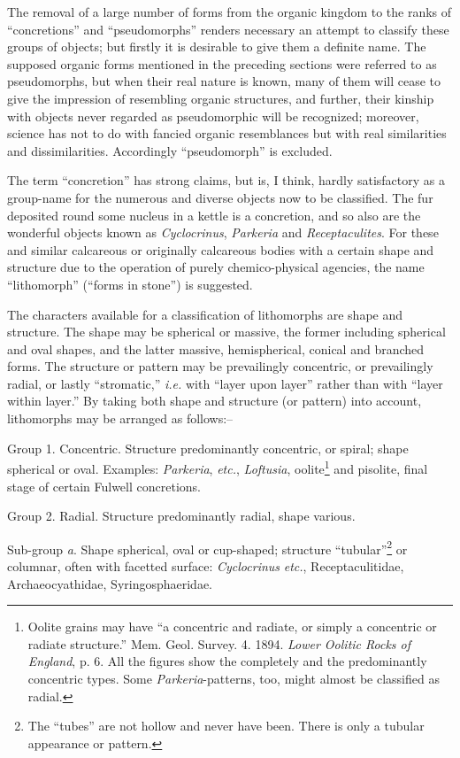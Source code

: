 \documentclass[a4paper, 12pt, oneside]{article}
\begin{document}
The removal of a large number of forms from the organic kingdom to the ranks of ``concretions'' and ``pseudomorphs'' renders necessary an attempt to classify these groups of objects; but firstly it is desirable to give them a definite name. The supposed organic forms mentioned in the preceding sections were referred to as pseudomorphs, but when their real nature is known, many of them will cease to give the impression of resembling organic structures, and further, their kinship with objects never regarded as pseudomorphic will be recognized; moreover, science has not to do with fancied organic resemblances but with real similarities and dissimilarities. Accordingly ``pseudomorph'' is excluded.

The term ``concretion'' has strong claims, but is, I think, hardly satisfactory as a group-name for the numerous and diverse objects now to be classified. The fur deposited round some nucleus in a kettle is a concretion, and so also are the wonderful objects known as \emph{Cyclocrinus}, \emph{Parkeria} and \emph{Receptaculites}. For these and similar calcareous or originally calcareous bodies with a certain shape and structure due to the operation of purely chemico-physical agencies, the name ``lithomorph'' (``forms in stone'') is suggested.

The characters available for a classification of lithomorphs are shape and structure. The shape may be spherical or massive, the former including spherical and oval shapes, and the latter massive, hemispherical, conical and branched forms. The structure or pattern may be prevailingly concentric, or prevailingly radial, or lastly ``stromatic,'' \emph{i.e.} with ``layer upon layer'' rather than with ``layer within layer.'' By taking both shape and structure (or pattern) into account, lithomorphs may be arranged as follows:--

Group 1. Concentric. Structure predominantly concentric, or spiral; shape spherical or oval. Examples: \emph{Parkeria}, \emph{etc.}, \emph{Loftusia}, oolite\footnote{Oolite grains may have ``a concentric and radiate, or simply a concentric or radiate structure.'' Mem. Geol. Survey. 4. 1894. \emph{Lower Oolitic Rocks of England}, p. 6. All the figures show the completely and the predominantly concentric types. Some \emph{Parkeria}-patterns, too, might almost be classified as radial.} and pisolite, final stage of certain Fulwell concretions.

Group 2. Radial. Structure predominantly radial, shape various.

Sub-group \emph{a}. Shape spherical, oval or cup-shaped; structure ``tubular''\footnote{The ``tubes'' are not hollow and never have been. There is only a tubular appearance or pattern.} or columnar, often with facetted surface: \emph{Cyclocrinus} \emph{etc.}, Receptaculitidae, Archaeocyathidae, Syringosphaeridae.
\end{document}
